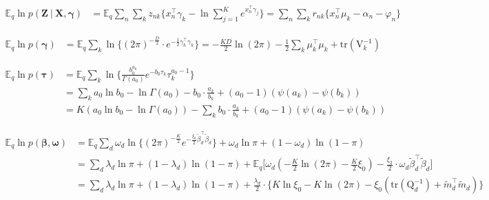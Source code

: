 \documentclass[twoside,11pt]{article}
\newcommand\given[1][]{\:#1\vert\:}
\newcommand{\transpose}[1]{#1^{\intercal}}
\newcommand{\nsum}{\sum\limits_{n}}
\newcommand{\ksum}{\sum\limits_{k}}
\newcommand{\boldbeta}{\boldsymbol\beta}
\newcommand{\boldgamma}{\boldsymbol\gamma}
\newcommand{\boldomega}{\boldsymbol\omega}
\newcommand{\boldtau}{\boldsymbol\tau}
\newcommand{\E}{\mathbb{E}}
\newcommand{\betad}{\tilde{\beta}_d}
\newcommand{\qmat}{\mathrm{Q}}
\newcommand{\trace}[1]{\mathrm{tr} \left( #1 \right)}
\begin{document}
\begin{align*}
	\E_q \ln p\left( \mathbf{Z} \given \mathbf{X}, \boldgamma \right) &= \E_q \nsum \ksum z_{nk} \Big\{ \transpose{x_n} \gamma_k - \ln \sum_{j=1}^K e^{\transpose{x_n}\gamma_j}\Big\} = \nsum \ksum r_{nk} \Big\{ \transpose{x_n} \mu_k - \alpha_n - \varphi_n \Big\}
\end{align*}

\begin{align*}
	\E_q \ln p\left( \boldgamma \right) &= \E_q \ksum  \ln \Big\{ (2\pi)^{-\frac{D}{2}} \cdot e^{-\frac{1}{2} \transpose{\gamma_k}\gamma_k}\Big\} = -\frac{KD}{2} \ln(2\pi) - \frac{1}{2} \ksum \transpose{\mu_k} \mu_k + \trace{\mathrm{V}_k^{-1}} 
\end{align*}

\begin{align*}
	\E_q \ln p\left( \boldtau \right) &= \E_q \ksum \ln \Big\{ \frac{b_0^{a_0}}{\Gamma(a_0)} e^{-b_0 \tau_k} \tau_k^{a_0 - 1} \Big\} \\
	&= \ksum a_0 \ln b_0 - \ln \Gamma(a_0) - b_0 \cdot \frac{a_k}{b_k} + (a_0 - 1) \left( \psi(a_k) - \psi(b_k) \right) \\
	&= K \left( a_0 \ln b_0 - \ln \Gamma(a_0) \right) - \ksum b_0 \cdot \frac{a_k}{b_k} + (a_0 - 1) \left( \psi(a_k) - \psi(b_k) \right)
\end{align*}


\begin{align*}
	\E_q \ln p\left( \boldbeta, \boldomega \right) &= \E_q \sum_d \omega_d \ln \Big\{ (2\pi)^{-\frac{K}{2}} e^{-\frac{\xi_0}{2} \transpose{\betad} \betad}\Big\} + \omega_d \ln \pi + (1 - \omega_d) \ln \left( 1 - \pi \right) \\
	&= \sum_d \lambda_d \ln \pi + (1 - \lambda_d) \ln (1 - \pi) + \E_q \Big[ \omega_d \left( - \frac{K}{2} \ln (2\pi) - \frac{K}{2} \xi_0 \right) - \frac{\xi_2}{2} \cdot \omega_d \transpose{\betad} \betad\Big] \\
	&= \sum_d \lambda_d \ln \pi + (1 - \lambda_d) \ln (1 - \pi) + \frac{\lambda_d}{2} \cdot \Big\{ K \ln \xi_0 - K \ln (2 \pi) - \xi_0 \left( \trace{\qmat_d^{-1}} + \transpose{\tilde{m}_d}\tilde{m}_d \right) \Big\}
\end{align*}

\end{document}
